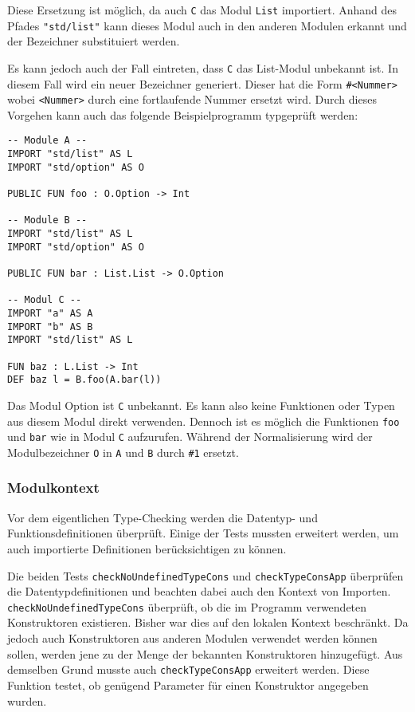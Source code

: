 \documentclass[runningheads]{llncs}
\begin{document}
Diese Ersetzung ist möglich, da auch \texttt{C} das Modul \texttt{List} importiert. Anhand des Pfades \verb|"std/list"| kann dieses Modul auch in den anderen Modulen erkannt und der Bezeichner substituiert werden.

Es kann jedoch auch der Fall eintreten, dass \texttt{C} das List-Modul unbekannt ist. In diesem Fall wird ein neuer Bezeichner generiert. Dieser hat die Form \verb|#<Nummer>| wobei \verb|<Nummer>| durch eine fortlaufende Nummer ersetzt wird. Durch dieses Vorgehen kann auch das folgende Beispielprogramm typgeprüft werden:


\begin{verbatim}
-- Module A --
IMPORT "std/list" AS L
IMPORT "std/option" AS O

PUBLIC FUN foo : O.Option -> Int

-- Module B --
IMPORT "std/list" AS L
IMPORT "std/option" AS O

PUBLIC FUN bar : List.List -> O.Option

-- Modul C --
IMPORT "a" AS A
IMPORT "b" AS B
IMPORT "std/list" AS L

FUN baz : L.List -> Int
DEF baz l = B.foo(A.bar(l))
\end{verbatim}

Das Modul Option ist \texttt{C} unbekannt. Es kann also keine Funktionen oder Typen aus diesem Modul direkt verwenden. Dennoch ist es möglich die Funktionen \verb|foo| und \verb|bar| wie in Modul \texttt{C} aufzurufen. Während der Normalisierung wird der Modulbezeichner \verb|O| in \texttt{A} und \texttt{B} durch \verb|#1| ersetzt.

\subsubsection{Modulkontext}

Vor dem eigentlichen Type-Checking werden die Datentyp- und Funktionsdefinitionen überprüft. Einige der Tests mussten erweitert werden, um auch importierte Definitionen berücksichtigen zu können.

Die beiden Tests \verb|checkNoUndefinedTypeCons| und \verb|checkTypeConsApp|
überprüfen die Datentypdefinitionen und beachten dabei auch den Kontext von Importen. \verb|checkNoUndefinedTypeCons| überprüft, ob die im Programm verwendeten Konstruktoren existieren. Bisher war dies auf den lokalen Kontext beschränkt. Da jedoch auch Konstruktoren aus anderen Modulen verwendet werden können sollen, werden jene zu der Menge der bekannten Konstruktoren hinzugefügt. Aus demselben Grund musste auch \verb|checkTypeConsApp| erweitert werden. Diese Funktion testet, ob genügend Parameter für einen Konstruktor angegeben wurden.
\end{document}
